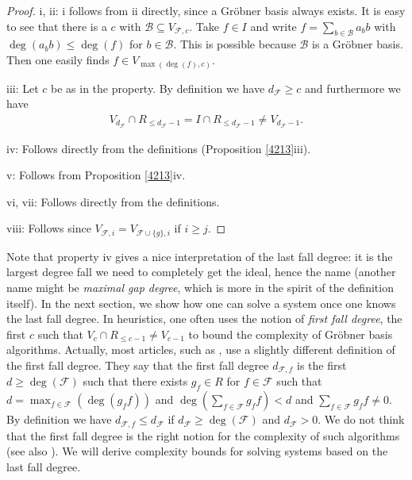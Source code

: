 \documentclass{amsart}
\theoremstyle{plain}
\theoremstyle{definition}
\begin{document}
\begin{proof}
i, ii: i follows from ii directly, since a Gr\"obner basis always exists. It is easy to see that there is a $c$ with $\mathcal{B} \subseteq V_{\mathcal{F},c}$. Take $f \in I$ and write $f=\sum_{b \in \mathcal{B}} a_b b$ with $\deg(a_b b) \leq \deg(f)$ for $b \in \mathcal{B}$. This is possible because $\mathcal{B}$ is a Gr\"obner basis. Then one easily finds $f \in V_{\max(\deg(f),c)}$.

iii: Let $c$ be as in the property. By definition we have $d_{\mathcal{F}} \geq c$ and furthermore we have
\begin{eqnarray*}
V_{d_{\mathcal{F}}} \cap R_{\leq d_{\mathcal{F}}-1} =I \cap R_{\leq d_{\mathcal{F}}-1} \neq V_{d_{\mathcal{F}}-1}.
\end{eqnarray*}

iv: Follows directly from the definitions (Proposition \ref{4213}iii).

v: Follows from Proposition \ref{4213}iv.

vi, vii: Follows directly from the definitions.

viii: Follows since $V_{\mathcal{F},i}=V_{\mathcal{F} \cup \{g\},i}$ if $i \geq j$.

\end{proof}

Note that property iv gives a nice interpretation of the last fall degree: it is the largest degree fall we need to completely get the ideal, hence the name (another name might be \emph{maximal gap degree}, which is more in the spirit of the definition itself). In the next section, we show how one can solve a system once one knows the last fall degree. In heuristics, one often uses the notion of \emph{first fall degree}, the first $c$ such that $V_c \cap R_{\leq c-1} \neq V_{c-1}$ to bound the complexity of Gr\"obner basis algorithms. Actually, most articles, such as \cite{PET}, use a slightly different definition of the first fall degree. They say that the first fall degree $d_{\mathcal{F},f}$ is the first $d \geq \deg(\mathcal{F})$ such that there exists $g_f \in R$ for $f \in \mathcal{F}$ such that $d=\max_{f \in \mathcal{F}}(\deg(g_f f))$ and $\deg( \sum_{f \in \mathcal{F}} g_f f )<d$ and $\sum_{f \in \mathcal{F}} g_f f \neq 0$. By definition we have $d_{\mathcal{F},f} \leq d_{\mathcal{F}}$ if $d_{\mathcal{F}} \geq \deg(\mathcal{F})$ and $d_{\mathcal{F}}>0$. We do not think that the first fall degree is the right notion for the complexity of such algorithms (see also \cite{KO14}). We will derive complexity bounds for solving systems based on the last fall degree.
\end{document}
